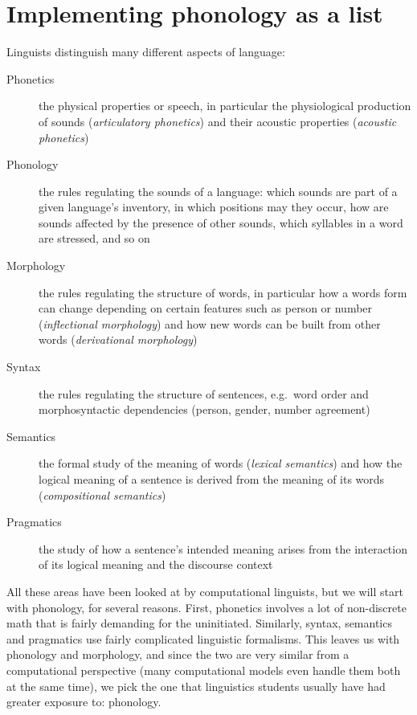 \chapter{Implementing phonology as a list}
\label{cha:listphonology}

Linguists distinguish many different aspects of language:
%
\begin{description}
    \item[Phonetics]
        the physical properties or speech, in particular the physiological production of sounds (\emph{articulatory phonetics}) and their acoustic properties (\emph{acoustic phonetics})
    \item[Phonology]
        the rules regulating the sounds of a language: which sounds are part of a given language's inventory, in which positions may they occur, how are sounds affected by the presence of other sounds, which syllables in a word are stressed, and so on
    \item[Morphology]
        the rules regulating the structure of words, in particular how a words form can change depending on certain features such as person or number (\emph{inflectional morphology}) and how new words can be built from other words (\emph{derivational morphology})
    \item[Syntax]
        the rules regulating the structure of sentences, e.g.\ word order and morphosyntactic dependencies (person, gender, number agreement)
    \item[Semantics]
        the formal study of the meaning of words (\emph{lexical semantics}) and how the logical meaning of a sentence is derived from the meaning of its words (\emph{compositional semantics})
    \item[Pragmatics]
        the study of how a sentence's intended meaning arises from the interaction of its logical meaning and the discourse context
\end{description}

All these areas have been looked at by computational linguists, but we will start with phonology, for several reasons.
First, phonetics involves a lot of non-discrete math that is fairly demanding for the uninitiated.
Similarly, syntax, semantics and pragmatics use fairly complicated linguistic formalisms.
This leaves us with phonology and morphology, and since the two are very similar from a computational perspective (many computational models even handle them both at the same time), we pick the one that linguistics students usually have had greater exposure to: phonology.

